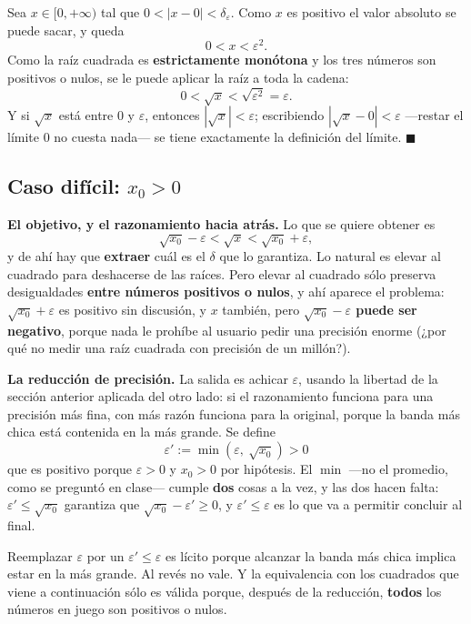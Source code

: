 \documentclass[12pt,a4paper]{article}
\begin{document}
Sea $x \in [0,+\infty)$ tal que $0 < |x - 0| < \delta_\varepsilon$. Como $x$ es
positivo el valor absoluto se puede sacar, y queda
\[
  0 < x < \varepsilon^{2}.
\]
Como la raíz cuadrada es \textbf{estrictamente monótona} y los tres números son
positivos o nulos, se le puede aplicar la raíz a toda la cadena:
\[
  0 < \sqrt{x} < \sqrt{\varepsilon^{2}} = \varepsilon.
\]
Y si $\sqrt x$ está entre $0$ y $\varepsilon$, entonces
$|\sqrt{x}| < \varepsilon$; escribiendo $|\sqrt{x} - 0| < \varepsilon$
---restar el límite $0$ no cuesta nada--- se tiene exactamente la definición
del límite. $\blacksquare$

\subsection{Caso difícil: $x_0 > 0$}

\textbf{El objetivo, y el razonamiento hacia atrás.} Lo que se quiere obtener
es
\[
  \sqrt{x_0} - \varepsilon < \sqrt{x} < \sqrt{x_0} + \varepsilon,
\]
y de ahí hay que \textbf{extraer} cuál es el $\delta$ que lo garantiza. Lo
natural es elevar al cuadrado para deshacerse de las raíces. Pero elevar al
cuadrado sólo preserva desigualdades \textbf{entre números positivos o nulos},
y ahí aparece el problema: $\sqrt{x_0} + \varepsilon$ es positivo sin
discusión, y $x$ también, pero \textbf{$\sqrt{x_0} - \varepsilon$ puede ser
negativo}, porque nada le prohíbe al usuario pedir una precisión enorme (¿por
qué no medir una raíz cuadrada con precisión de un millón?).

\textbf{La reducción de precisión.} La salida es achicar $\varepsilon$, usando
la libertad de la sección anterior aplicada del otro lado: si el razonamiento
funciona para una precisión más fina, con más razón funciona para la original,
porque la banda más chica está contenida en la más grande. Se define
\[
  \boxed{\varepsilon' := \min\left(\varepsilon,\ \sqrt{x_0}\right) > 0}
\]
que es positivo porque $\varepsilon > 0$ y $x_0 > 0$ por hipótesis. El $\min$
---no el promedio, como se preguntó en clase--- cumple \textbf{dos} cosas a la
vez, y las dos hacen falta: $\varepsilon' \leq \sqrt{x_0}$ garantiza que
$\sqrt{x_0} - \varepsilon' \geq 0$, y $\varepsilon' \leq \varepsilon$ es lo que
va a permitir concluir al final.

\begin{warnbox}
Reemplazar $\varepsilon$ por un $\varepsilon' \leq \varepsilon$ es lícito
porque alcanzar la banda más chica implica estar en la más grande. Al revés no
vale. Y la equivalencia con los cuadrados que viene a continuación sólo es
válida porque, después de la reducción, \textbf{todos} los números en juego son
positivos o nulos.
\end{warnbox}
\end{document}
